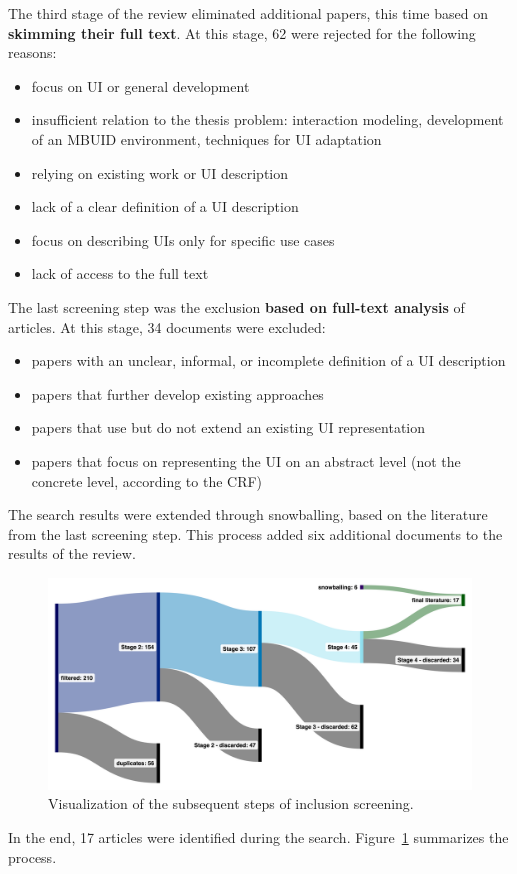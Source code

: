 The third stage of the review eliminated additional papers, this time based on \textbf{skimming their full text}.
At this stage, 62 were rejected for the following reasons:
\begin{itemize}
    \item focus on UI or general development
    \item insufficient relation to the thesis problem: interaction modeling, development of an MBUID environment, techniques for UI adaptation
    \item relying on existing work or UI description
    \item lack of a clear definition of a UI description
    \item focus on describing UIs only for specific use cases
    \item lack of access to the full text
\end{itemize}

The last screening step was the exclusion \textbf{based on full-text analysis} of articles.
At this stage, 34 documents were excluded:
\begin{itemize}
    \item papers with an unclear, informal, or incomplete definition of a UI description
    \item papers that further develop existing approaches
    \item papers that use but do not extend an existing UI representation
    \item papers that focus on representing the UI on an abstract level (not the concrete level, according to the CRF)
\end{itemize}

The search results were extended through snowballing, based on the literature from the last screening step.
This process added six additional documents to the results of the review.

\begin{figure}
    \centering
    \includegraphics[width=\textwidth]{./2-literature-review/conducting-the-search}
    \caption{Visualization of the subsequent steps of inclusion screening.}
    \label{fig:conducting-the-search-vis}
\end{figure}

In the end, 17 articles were identified during the search.
Figure~\ref{fig:conducting-the-search-vis} summarizes the process.

